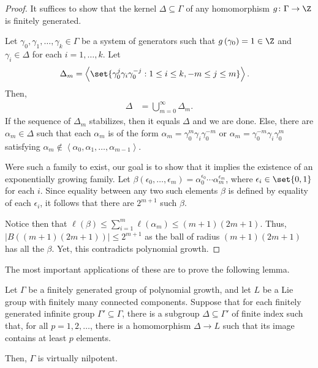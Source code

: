 \documentclass[10pt]{mypackage}
\begin{document}
\begin{proof}
  It suffices to show that the kernel $\Delta\subseteq \Gamma$ of any homomorphism $g\colon \Gamma\to\Z$ is finitely generated. 

  Let $\gamma_0,\gamma_1,\dots,\gamma_k\in \Gamma$ be a system of generators such that $g\left( \gamma_0 \right) = 1\in \Z$ and $\gamma_i\in \Delta$ for each $i=1,\dots,k$. Let
  \begin{align*}
    \Delta_m &= \left\langle \set{\gamma_0^{j}\gamma_i\gamma_0^{-j} : 1\leq i \leq k, -m\leq j \leq m} \right\rangle.
  \end{align*}
  Then,
  \begin{align*}
    \Delta &= \bigcup_{m=0}^{\infty} \Delta_m.
  \end{align*}
  If the sequence of $\Delta_m$ stabilizes, then it equals $\Delta$ and we are done. Else, there are $\alpha_m\in \Delta$ such that each $\alpha_m$ is of the form $\alpha_m = \gamma_0^{m}\gamma_i\gamma_0^{-m}$ or $\alpha_m = \gamma_0^{-m}\gamma_i\gamma_0^{m}$ satisfying $\alpha_m\notin \left\langle \alpha_0,\alpha_1,\dots,\alpha_{m-1} \right\rangle$.

  Were such a family to exist, our goal is to show that it implies the existence of an exponentially growing family. Let $\beta\left( \epsilon_0,\dots,\epsilon_m \right) = \alpha_0^{\epsilon_0}\cdots\alpha_m^{\epsilon_m}$, where $\epsilon_i \in\set{0,1}$ for each $i$. Since equality between any two such elements $\beta$ is defined by equality of each $\epsilon_i$, it follows that there are $2^{m+1}$ such $\beta$.

  Notice then that $\ell\left( \beta \right)\leq \sum_{i=1}^{m}\ell\left( \alpha_m \right)\leq \left( m+1 \right)\left( 2m+1 \right)$. Thus, $\left\vert B\left( \left( m+1 \right)\left( 2m+1 \right) \right) \right\vert\leq 2^{m+1}$ as the ball of radius $\left( m+1 \right)\left( 2m+1 \right)$ has all the $\beta$. Yet, this contradicts polynomial growth.
\end{proof}
The most important applications of these are to prove the following lemma. 
\begin{lemma}[Lemma 1]
  Let $\Gamma$ be a finitely generated group of polynomial growth, and let $L$ be a Lie group with finitely many connected components. Suppose that for each finitely generated infinite group $\Gamma'\subseteq \Gamma$, there is a subgroup $\Delta\subseteq \Gamma'$ of finite index such that, for all $p=1,2,\dots$, there is a homomorphism $\Delta\to L$ such that its image contains at least $p$ elements.

  Then, $\Gamma$ is virtually nilpotent.
\end{lemma}
\end{document}
